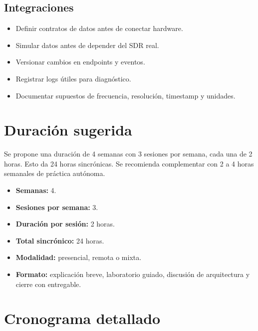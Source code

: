 \documentclass[11pt,a4paper]{article}
\begin{document}
\subsection*{Integraciones}

\begin{itemize}
  \item Definir contratos de datos antes de conectar hardware.
  \item Simular datos antes de depender del SDR real.
  \item Versionar cambios en endpoints y eventos.
  \item Registrar logs útiles para diagnóstico.
  \item Documentar supuestos de frecuencia, resolución, timestamp y unidades.
\end{itemize}

\section*{Duración sugerida}

Se propone una duración de 4 semanas con 3 sesiones por semana, cada una de 2 horas. Esto da 24 horas sincrónicas. Se recomienda complementar con 2 a 4 horas semanales de práctica autónoma.

\begin{itemize}
  \item \textbf{Semanas:} 4.
  \item \textbf{Sesiones por semana:} 3.
  \item \textbf{Duración por sesión:} 2 horas.
  \item \textbf{Total sincrónico:} 24 horas.
  \item \textbf{Modalidad:} presencial, remota o mixta.
  \item \textbf{Formato:} explicación breve, laboratorio guiado, discusión de arquitectura y cierre con entregable.
\end{itemize}

\section*{Cronograma detallado}
\end{document}
